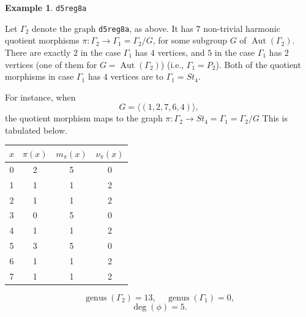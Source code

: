 \documentclass[12pt,letterpaper]{article}
\theoremstyle{definition}
\newtheorem{example}[theorem]{Example}
\DeclareMathOperator{\Aut}{Aut}
\DeclareMathOperator{\genus}{genus}
\begin{document}
\begin{example}%
\label{example:d5reg8a}
  {\tt d5reg8a}\newline
{\rm  
  Let $\Gamma_2$ denote the graph {\tt d5reg8a}, as above.
It has $7$  non-trivial harmonic quotient morphisms
$\pi: \Gamma_2\to \Gamma_1=\Gamma_2/G$,
for some subgroup $G$ of $\Aut(\Gamma_2)$.
There are exactly $2$ in the case $\Gamma_1$ has $4$ vertices,
and $5$ in the case $\Gamma_1$ has $2$ vertices (one of them for $G=\Aut(\Gamma_2)$)
(i.e., $\Gamma_1=P_2$).
Both of the quotient morphisms in case $\Gamma_1$ has $4$ vertices
are to $\Gamma_1=St_4$. 

For instance, when
\[
G = \langle (1,2,7,6,4) \rangle ,
\]
the quotient morphism maps to the graph
$\pi: \Gamma_2\to St_4=\Gamma_1=\Gamma_2/G $
This is tabulated below.

\begin{center}
\begin{tabular}{c|c|c|c}  
  $x$ & $\pi(x)$ & $m_\pi(x)$ & $\nu_\pi(x)$   \\ \hline
  0   &    2   &        5         &  0  \\ 
  1   &    1   &        1         &  2  \\ 
  2   &    1   &        1         &  2  \\ 
  3   &    0   &        5         &  0   \\
  4   &    1   &        1         &  2   \\
  5   &    3   &        5         &  0   \\
  6   &    1   &        1         &  2   \\
  7   &    1   &        1         &  2   \\
\end{tabular}
\end{center}

\[
  \genus(\Gamma_2) =13,\ \ \ \ \
  \genus(\Gamma_1) =0,
\]
\[
\deg(\phi) =5.
\]
  
}
\end{example}
\end{document}
